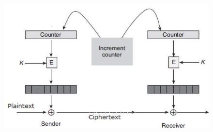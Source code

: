 \documentclass[11pt]{article}
\begin{document}
\begin{enumerate}
\begin{enumerate}
		            \begin{figure}[H]
			            \centering
			            \includegraphics[scale=0.5]{ctr_mode.jpg}
			            \caption{}
		            \end{figure}
	      \end{enumerate}
\end{enumerate}
\end{document}
